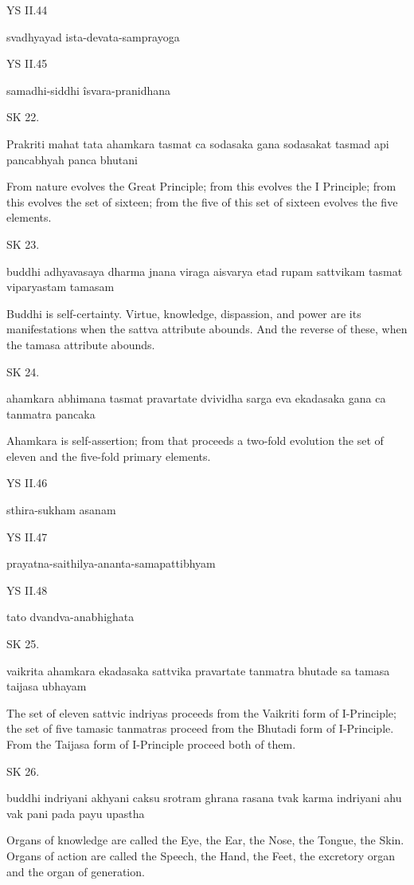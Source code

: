 YS II.44

    svadhyayad ista-devata-samprayoga

YS II.45

    samadhi-siddhi îsvara-pranidhana

SK 22.

Prakriti mahat tata ahamkara tasmat ca sodasaka gana
sodasakat tasmad api pancabhyah panca bhutani

From nature evolves the Great Principle;
from this evolves the I Principle;
from this evolves the set of sixteen;
from the five of this set of sixteen evolves the five elements.

SK 23.

buddhi adhyavasaya dharma jnana viraga aisvarya
etad rupam sattvikam tasmat viparyastam tamasam

Buddhi is self-certainty.
Virtue, knowledge, dispassion, and power are its manifestations
when the sattva attribute abounds.
And the reverse of these, when the tamasa attribute abounds.

SK 24.

ahamkara abhimana tasmat pravartate dvividha sarga eva
ekadasaka gana ca tanmatra pancaka

Ahamkara is self-assertion;
from that proceeds a two-fold evolution
the set of eleven and the five-fold primary elements.

YS II.46

    sthira-sukham asanam

YS II.47

    prayatna-saithilya-ananta-samapattibhyam

YS II.48

    tato dvandva-anabhighata

SK 25.

vaikrita ahamkara ekadasaka sattvika pravartate
tanmatra bhutade sa tamasa taijasa ubhayam

The set of eleven sattvic indriyas proceeds from the Vaikriti form of I-Principle;
the set of five tamasic tanmatras proceed from the Bhutadi form of I-Principle.
From the Taijasa form of I-Principle proceed both of them.

SK 26.

buddhi indriyani akhyani caksu srotram ghrana rasana tvak
karma indriyani ahu vak pani pada payu upastha

Organs of knowledge are called the Eye, the Ear, the Nose, the Tongue, the Skin.
Organs of action are called the Speech, the Hand, the Feet, the excretory organ and the organ of generation.

